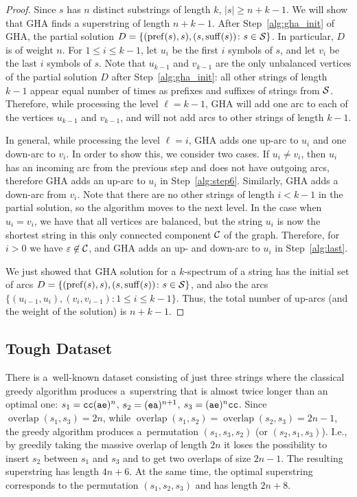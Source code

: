 \documentclass[11pt]{article}
\DeclareMathOperator{\overlap}{overlap}
\renewcommand{\geq}{\geqslant}
\renewcommand{\leq}{\leqslant}
\begin{document}
\begin{proof}
Since $s$ has $n$ distinct substrings of length $k, \, |s|\geq n+k-1$. We will show that GHA finds a superstring of length $n+k-1$. After Step~\ref{alg:gha_init} of GHA, the partial solution $D = \{(\operatorname{pref}(s), s), (s, \operatorname{suff}(s)) \colon s \in {\cal S}\}$. In particular, $D$ is of weight $n$. For $1\leq i\leq k-1$, let $u_{i}$ be the first $i$ symbols of $s$, and let $v_{i}$ be the last $i$ symbols of $s$. Note that $u_{k-1}$ and $v_{k-1}$ are the only unbalanced vertices of the partial solution $D$ after Step~\ref{alg:gha_init}: all other strings of length $k-1$ appear equal number of times as prefixes and suffixes of strings from ${\cal S}$. Therefore, while processing the level $\ell=k-1$, GHA will add one arc to each of the vertices $u_{k-1}$ and $v_{k-1}$, and will not add arcs to other strings of length $k-1$. 

In general, while processing the level $\ell=i$, GHA adds one up-arc to $u_i$ and one down-arc to $v_i$. In order to show this, we consider two cases. If $u_i \neq v_i$, then $u_i$ has an incoming arc from the previous step and does not have outgoing arcs, therefore GHA adds an up-arc to $u_i$ in Step~\ref{alg:step6}. Similarly, GHA adds a down-arc from $v_i$. Note that there are no other strings of length $i<k-1$ in the partial solution, so the algorithm moves to the next level. In the case when $u_i=v_i$, we have that all vertices are balanced, but the string $u_i$ is now the shortest string in this only connected component ${\cal C}$ of the graph. Therefore, for $i>0$ we have $\varepsilon\not\in{\cal C}$, and GHA adds an up- and down-arc to $u_i$ in Step~\ref{alg:last}. 

We just showed that GHA solution for a $k$-spectrum of a string has the initial set of arcs  $D = \{(\operatorname{pref}(s), s), (s, \operatorname{suff}(s)) \colon s \in {\cal S}\}$, and also the arcs $\{ (u_{i-1}, u_{i}), (v_i, v_{i-1})\colon 1\leq i\leq k-1 \}$. Thus, the total number of up-arcs (and the weight of the solution) is $n+k-1$.
\end{proof}

\subsection{Tough Dataset}
There is a~well-known dataset consisting of just three strings where the classical greedy algorithm produces a~superstring that is almost twice longer than an optimal one: $s_1={\tt cc}({\tt ae})^n$, $s_2=({\tt ea})^{n+1}$, $s_3=({\tt ae})^n{\tt cc}$. Since $\overlap(s_1, s_3)=2n$,
 while $\overlap(s_1,s_2)=\overlap(s_2,s_3)=2n-1$, the greedy algorithm produces a~permutation $(s_1, s_3, s_2)$ (or $(s_2,s_1,s_3)$). I.e., by greedily taking the massive overlap of length $2n$ it loses the possibility to insert $s_2$ between $s_1$ and $s_3$ and to get two overlaps of size $2n-1$. The resulting superstring has length $4n+6$. At the same time, the optimal superstring corresponds to the permutation $(s_1,s_2,s_3)$ and has length $2n+8$.
 
\end{document}
